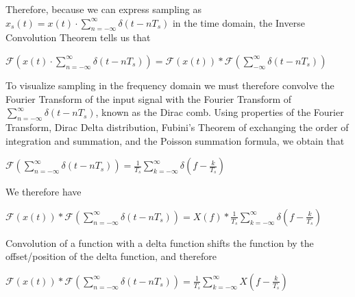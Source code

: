 \documentclass{article}
\begin{document}
Therefore, because we can express sampling as $x_s(t) = x(t) \cdot \displaystyle\sum_{n=-\infty}^{\infty} \delta (t-nT_s)$ in the time domain, the Inverse Convolution Theorem tells us that %
\begin{center}
    \begin{math}
        \mathcal{F}\left(x(t) \cdot \displaystyle\sum_{n=-\infty}^{\infty} \delta (t-nT_s)\right) = \mathcal{F}(x(t)) * \mathcal{F}\left(\displaystyle \sum_{-\infty}^{\infty} \delta (t-nT_s) \right)
    \end{math}  
\end{center}

To visualize sampling in the frequency domain we must therefore convolve the Fourier Transform of the input signal with the Fourier Transform of $\displaystyle\sum_{n=-\infty}^{\infty} \delta (t-nT_s)$, known as the Dirac comb.
Using properties of the Fourier Transform, Dirac Delta distribution, Fubini's Theorem of exchanging the order of integration and summation, 
and the Poisson summation formula, 
we obtain that 
\begin{center}
    \begin{math}
        \mathcal{F}\left(\displaystyle\sum_{n=-\infty}^{\infty} \delta (t-nT_s)\right) = \frac{1}{T_s} \displaystyle\sum_{k = -\infty}^{\infty} \delta \left( f - \frac{k}{T_s} \right)
    \end{math}  
\end{center}
We therefore have
\begin{center}
    \begin{math}
        \mathcal{F}(x(t)) * \mathcal{F}\left(\displaystyle \sum_{n=-\infty}^{\infty} \delta (t-nT_s) \right) = X(f) * \frac{1}{T_s}\displaystyle \sum_{k = -\infty}^{\infty} \delta \left( f - \frac{k}{T_s} \right)
    \end{math}  
\end{center}
Convolution of a function with a delta function shifts the function by the offset/position of the delta function, and therefore 
\begin{center}
    \begin{math}
        \mathcal{F}(x(t)) * \mathcal{F}\left(\displaystyle \sum_{n=-\infty}^{\infty} \delta (t-nT_s) \right) 
        = 
        \frac{1}{T_s} \displaystyle\sum_{k=-\infty}^{\infty}X\left(f - \frac{k}{T_s} \right)
    \end{math}  
\end{center}
\end{document}
